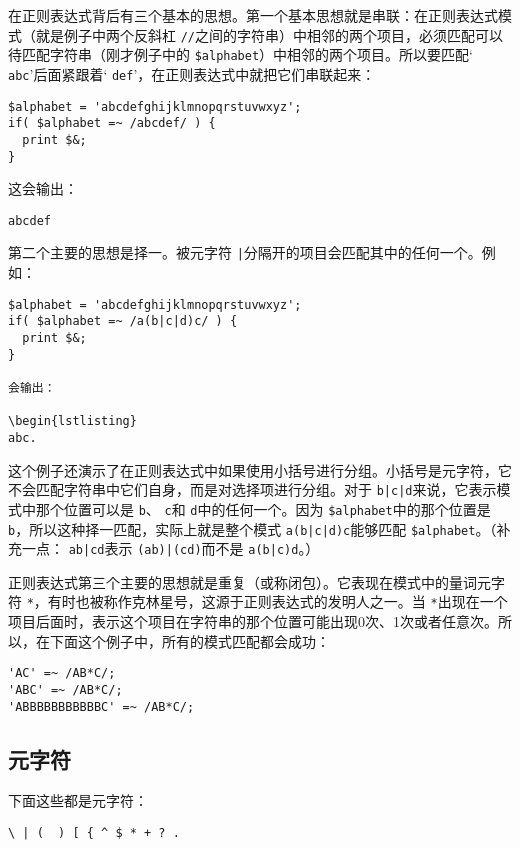 在正则表达式背后有三个基本的思想。第一个基本思想就是串联：在正则表达式模式（就是例子中两个反斜杠 \verb|//|之间的字符串）中相邻的两个项目，必须匹配可以待匹配字符串（刚才例子中的 \verb|$alphabet|）中相邻的两个项目。所以要匹配` \verb|abc|'后面紧跟着` \verb|def|'，在正则表达式中就把它们串联起来：

\begin{lstlisting}
$alphabet = 'abcdefghijklmnopqrstuvwxyz';
if( $alphabet =~ /abcdef/ ) {
  print $&; 
}
\end{lstlisting}

这会输出：

\begin{lstlisting}
abcdef
\end{lstlisting}

第二个主要的思想是择一。被元字符 \verb=|=分隔开的项目会匹配其中的任何一个。例如：

\begin{lstlisting}
$alphabet = 'abcdefghijklmnopqrstuvwxyz';
if( $alphabet =~ /a(b|c|d)c/ ) {
  print $&;
}

会输出：

\begin{lstlisting}
abc.
\end{lstlisting}

这个例子还演示了在正则表达式中如果使用小括号进行分组。小括号是元字符，它不会匹配字符串中它们自身，而是对选择项进行分组。对于 \verb=b|c|d=来说，它表示模式中那个位置可以是 \verb|b|、 \verb|c|和 \verb|d|中的任何一个。因为 \verb|$alphabet|中的那个位置是 \verb|b|，所以这种择一匹配，实际上就是整个模式 \verb=a(b|c|d)c=能够匹配 \verb|$alphabet|。（补充一点： \verb=ab|cd=表示 \verb=(ab)|(cd)=而不是 \verb=a(b|c)d=。）

正则表达式第三个主要的思想就是重复（或称闭包）。它表现在模式中的量词元字符 \verb|*|，有时也被称作克林星号，这源于正则表达式的发明人之一。当 \verb|*|出现在一个项目后面时，表示这个项目在字符串的那个位置可能出现0次、1次或者任意次。所以，在下面这个例子中，所有的模式匹配都会成功：

\begin{lstlisting}
'AC' =~ /AB*C/;
'ABC' =~ /AB*C/;
'ABBBBBBBBBBBC' =~ /AB*C/;
\end{lstlisting}

\subsection{元字符}
下面这些都是元字符：

\begin{lstlisting}
\ | (  ) [ { ^ $ * + ? .
\end{lstlisting}

